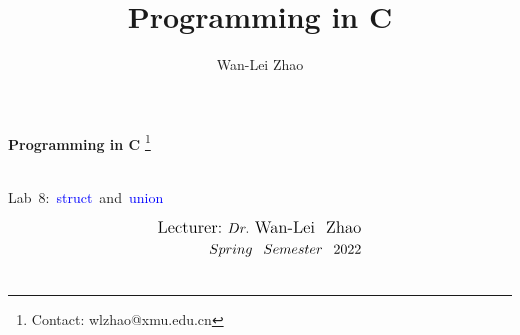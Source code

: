 \documentclass[t]{beamer}
\title{Programming in C}
\author{Wan-Lei Zhao}
\newcommand\blfootnote[1]{
  \begingroup
  \renewcommand\thefootnote{}\footnote{#1}
  \addtocounter{footnote}{-1}
  \endgroup
}
\begin{document}
\begin{frame}
   \begin{center}
    \vspace{24pt}
    \Huge\textbf{Programming in C}\blfootnote{Contact: wlzhao@xmu.edu.cn}\\
     \Huge{\mbox{Lab 8: \textcolor{blue}{struct} and \textcolor{blue}{union}}}
    \vspace{36pt}
  \end{center}
  \begin{align*}
   \vspace{18pt}
      \large{\mbox{Lecturer:}~Dr.~\mbox{Wan-Lei~~Zhao}} \\
      \large{Spring~~Semester~~2022} \\
   \vspace{30pt}
  \end{align*}
\end{frame}



\end{document}
